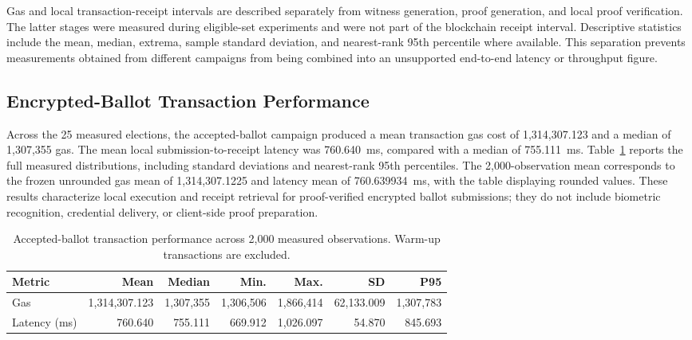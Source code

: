Gas and local transaction-receipt intervals are described separately from witness generation, proof generation, and local proof verification. The latter stages were measured during eligible-set experiments and were not part of the blockchain receipt interval. Descriptive statistics include the mean, median, extrema, sample standard deviation, and nearest-rank 95th percentile where available. This separation prevents measurements obtained from different campaigns from being combined into an unsupported end-to-end latency or throughput figure.

\subsection{Encrypted-Ballot Transaction Performance}
\label{subsec:results-accepted-ballots}
\label{subsec:discussion-transaction-costs}

Across the 25 measured elections, the accepted-ballot campaign produced a mean transaction gas cost of 1,314,307.123 and a median of 1,307,355 gas. The mean local submission-to-receipt latency was 760.640~ms, compared with a median of 755.111~ms. Table~\ref{tab:results-accepted-overall} reports the full measured distributions, including standard deviations and nearest-rank 95th percentiles. The 2,000-observation mean corresponds to the frozen unrounded gas mean of 1,314,307.1225 and latency mean of 760.639934~ms, with the table displaying rounded values. These results characterize local execution and receipt retrieval for proof-verified encrypted ballot submissions; they do not include biometric recognition, credential delivery, or client-side proof preparation.

\begin{table}[t]
\centering
\caption{Accepted-ballot transaction performance
across 2,000 measured observations.
Warm-up transactions are excluded.}
\label{tab:results-accepted-overall}
\scriptsize
\setlength{\tabcolsep}{3pt}
\begin{tabular}{@{}lrrrrrr@{}}
\toprule
\textbf{Metric} &
\textbf{Mean} &
\textbf{Median} &
\textbf{Min.} &
\textbf{Max.} &
\textbf{SD} &
\textbf{P95} \\
\midrule
Gas
& 1,314,307.123
& 1,307,355
& 1,306,506
& 1,866,414
& 62,133.009
& 1,307,783 \\
Latency (ms)
& 760.640
& 755.111
& 669.912
& 1,026.097
& 54.870
& 845.693 \\
\bottomrule
\end{tabular}
\end{table}

